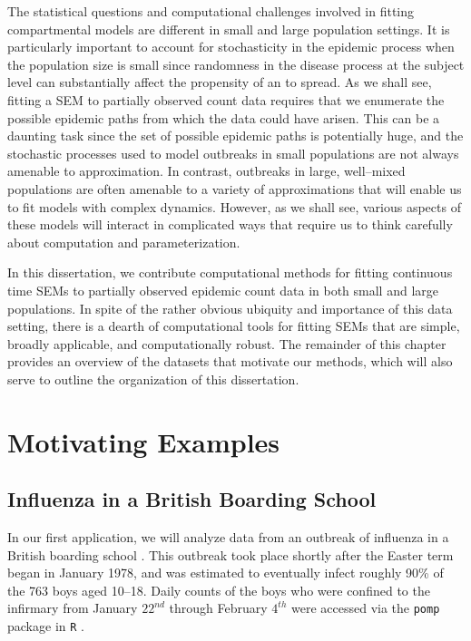 The statistical questions and computational challenges involved in fitting compartmental models are different in small and large population settings. 
It is particularly important to account for stochasticity in the epidemic process when the population size is small since randomness in the disease process at the subject level can substantially affect the propensity of an   to spread. 
As we shall see, fitting a SEM to partially observed count data requires that we enumerate the possible epidemic paths from which the data could have arisen. This can be a daunting task since the set of possible epidemic paths is potentially huge, and the stochastic processes used to model outbreaks in small populations are not always amenable to approximation. In contrast, outbreaks in large, well--mixed populations are often amenable to a variety of approximations that will enable us to fit models with complex dynamics. However, as we shall see, various aspects of these models will interact in complicated ways that require us to think carefully about computation and parameterization. 

In this dissertation, we contribute computational methods for fitting continuous time SEMs to partially observed epidemic count data in both small and large populations. In spite of the rather obvious ubiquity and importance of this data setting, there is a dearth of computational tools for fitting SEMs that are simple, broadly applicable, and computationally robust. The remainder of this chapter provides an overview of the datasets that motivate our methods, which will also serve to outline the organization of this dissertation. 

\section{Motivating Examples}
\label{sec:motivating_examples}
 
\subsection{Influenza in a British Boarding School}
\label{subsec:bbs_descrip}

In our first application, we will analyze data from an outbreak of influenza in a British boarding school \citep{anon1978, davies1982}. This outbreak took place shortly after the Easter term began in January 1978, and was estimated to eventually infect roughly 90\% of the 763 boys aged 10--18. Daily counts of the boys who were confined to the infirmary from January $22^{nd}$ through February $4^{th}$ were accessed via the \texttt{pomp} package in \texttt{R} \citep{pomp}.

